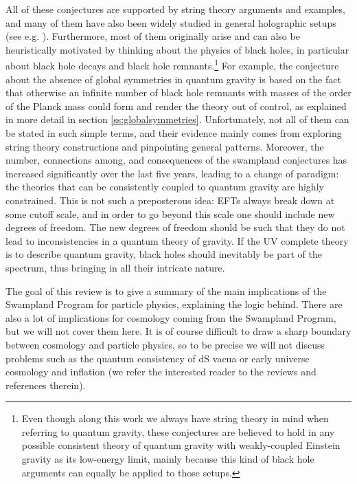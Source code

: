 \documentclass[11pt,a4paper]{article}
\begin{document}
All of these conjectures are supported by string theory arguments and examples, and many of them have also been widely studied in general holographic setups (see e.g. \cite{Harlow:2018jwu, Harlow:2018tng,Montero:2018fns}). Furthermore, most of them originally arise and can also be heuristically motivated by thinking about the physics of black holes, in particular about black hole decays and black hole remnants.\footnote{Even though along this work we always have string theory in mind when referring to quantum gravity, these conjectures are believed to hold in any possible consistent theory of quantum gravity with weakly-coupled Einstein gravity as its low-energy limit, mainly because this kind of black hole arguments can equally be applied to those setups.} For example, the conjecture about the absence of global symmetries in quantum gravity is based on the fact that otherwise an infinite number of black hole remnants with masses of the order of the Planck mass could form and render the theory out of control, as explained in more detail in section \ref{ss:globalsymmetries}. Unfortunately, not all of them can be stated in such simple terms, and their evidence mainly comes from exploring string theory constructions and pinpointing general patterns. Moreover, the number, connections among, and consequences of the swampland conjectures has increased significantly over the last five years, leading to a change of paradigm: the theories that can be consistently coupled to quantum gravity are highly constrained.  This is not such a preposterous idea: EFTs always break down at some cutoff scale, and in order to go beyond this scale one should include new degrees of freedom. The new degrees of freedom should be such that they do not lead to inconsistencies in a quantum theory of gravity. If the UV complete theory is to describe quantum gravity, black holes should inevitably be part of the spectrum, thus bringing in all their intricate nature.   

The goal of this review is to give a summary of the main implications of the Swampland Program for particle physics, explaining the logic behind. 
There are also a lot of implications for cosmology coming from the Swampland Program, but we will not cover them here. It is of course difficult to draw a sharp boundary between cosmology and  particle physics, so to be precise we will not discuss problems such as the quantum consistency of dS vacua or early universe cosmology and inflation (we refer the interested reader to the reviews \cite{Brennan:2017rbf,Palti:2019pca,vanBeest:2021lhn} and references therein).
\end{document}
